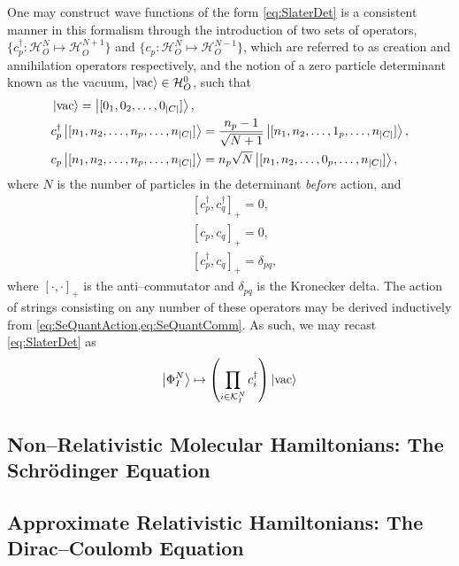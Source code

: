 One may construct wave functions of the form \cref{eq:SlaterDet} is a consistent manner in this formalism through
the introduction of two sets of operators, ${\{ c_p^\dagger : \mathcal{H}^N_O \mapsto \mathcal{H}^{N+1}_O\}}$ and 
${\{ c_p : \mathcal{H}^N_O \mapsto \mathcal{H}^{N-1}_O \}}$, which are referred to as creation and annihilation operators 
respectively, and the notion of a zero particle determinant known as the vacuum, $\left\vert \mathrm{vac} \right\rangle \in \mathcal{H}^0_O$, such that
\begin{subequations}
  \label{eq:SeQuantAction}
\begin{align}
  &\left\vert \mathrm{vac} \right\rangle = \left\vert [0_1, 0_2, \ldots, 0_{\vert C \vert}] \right\rangle, \\
  &c_p^\dagger \left\vert [n_1, n_2, \ldots, n_p, \ldots, n_{\vert C \vert}] \right\rangle = \frac{n_p-1}{\sqrt{N+1}} \left\vert [n_1, n_2, \ldots, 1_p, \ldots, n_{\vert C \vert}] \right\rangle,\\
  &c_p \left\vert [n_1, n_2, \ldots, n_p, \ldots, n_{\vert C \vert}] \right\rangle = {n_p}{\sqrt{N}} \left\vert [n_1, n_2, \ldots, 0_p, \ldots, n_{\vert C \vert}] \right\rangle,
\end{align}
\end{subequations}
where $N$ is the number of particles in the determinant \emph{before} action, and
\begin{subequations}
  \label{eq:SeQuantComm}
\begin{align}
  &[c_p^\dagger, c_q^\dagger]_+ = 0,\\
  &[c_p, c_q]_+ = 0,\\
  &[c_p^\dagger, c_q]_+ = \delta_{pq},
\end{align}
\end{subequations}
where $[\cdot,\cdot]_+$ is the anti--commutator and $\delta_{pq}$ is the Kronecker delta. The action of strings consisting on any number of these 
operators may be derived inductively from \cref{eq:SeQuantAction,eq:SeQuantComm}. As such, we may recast \cref{eq:SlaterDet} as
\begin{equation}
  \left\vert \Phi^N_I \right\rangle \mapsto \left(\prod_{i \in \mathcal{K}^N_I} c_i^\dagger\right) \left\vert \mathrm{vac} \right\rangle
\end{equation}

\subsection{Non--Relativistic Molecular Hamiltonians: The Schr\"{o}dinger Equation}
\label{sec:NRH}

\subsection{Approximate Relativistic Hamiltonians: The Dirac--Coulomb Equation}
\label{sec:RELH}



